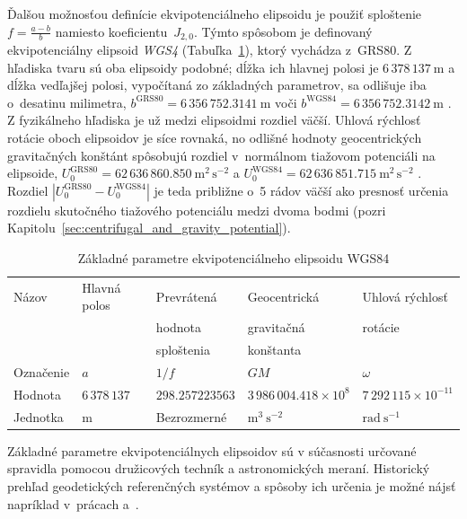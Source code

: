 \documentclass[a4paper,12pt]{book}
\begin{document}
Ďalšou možnosťou definície ekvipotenciálneho elipsoidu je použiť sploštenie~$f 
= \frac{a - b}{b}$ namiesto koeficientu~$J_{2,0}$.  Týmto spôsobom je 
definovaný ekvipotenciálny elipsoid \emph{WGS4} (Tabuľka~\ref{tab:2}), ktorý 
vychádza z~GRS80.  Z hľadiska tvaru sú oba elipsoidy podobné; dĺžka ich hlavnej 
polosi je $6\, 378\, 137\ \mathrm{m}$ a dĺžka vedľajšej polosi, vypočítaná zo 
základných parametrov, sa odlišuje iba o~desatinu milimetra, 
$b^{\mathrm{GRS80}} = 6\, 356\, 752.3141\ \mathrm{m}$ voči $b^{\mathrm{WGS84}} 
= 6\, 356\, 752.3142\ \mathrm{m}$ \parencite{MoritzPhysicalGeodesy}.  
Z fyzikálneho hľadiska je už medzi elipsoidmi rozdiel väčší.  Uhlová rýchlosť 
rotácie oboch elipsoidov je síce rovnaká, no odlišné hodnoty geocentrických 
gravitačných konštánt spôsobujú rozdiel v~normálnom tiažovom potenciáli na 
elipsoide, $U_{0}^{\mathrm{GRS80}} = 62\, 636\, 860.850\ \mathrm{m}^2 \, 
\mathrm{s}^{-2}$ a $U_{0}^{\mathrm{WGS84}} = 62\, 636\, 851.715\ \mathrm{m}^2 
\, \mathrm{s}^{-2}$ \parencite{MoritzPhysicalGeodesy}.  Rozdiel 
$|U_0^{\mathrm{GRS80}} - U_0^{\mathrm{WGS84}}|$ je teda približne o~5 rádov 
väčší ako presnosť určenia rozdielu skutočného tiažového potenciálu medzi dvoma 
bodmi (pozri Kapitolu~\ref{sec:centrifugal_and_gravity_potential}).

\begin{table}
\begin{center}
\caption{Základné parametre ekvipotenciálneho elipsoidu WGS84 
\parencite{WGS84}}
\label{tab:2}
\begin{tabular}{l l l l l}
\hline
Názov     & Hlavná polos & Prevrátená & Geocentrická & Uhlová rýchlosť \\
          &              & hodnota    & gravitačná  &  rotácie\\
          &              & sploštenia & konštanta               & \\
\hline
Označenie & $a$ & $1 \slash f$ & $GM$ & $\omega$\\
Hodnota   & $6\,378\,137$ & $298.257223563$ & $3\,986\,004.418 \times 10^8$ 
& $7\,292\,115 \times 10^{-11}$\\
Jednotka  & $\mathrm{m}$ & Bezrozmerné & $\mathrm{m}^3 \ \mathrm{s}^{-2}$ 
& $\mathrm{rad} \ \mathrm{s}^{-1}$\\
\hline
\end{tabular}
\end{center}
\end{table}

Základné parametre ekvipotenciálnych elipsoidov sú v súčasnosti určované 
spravidla pomocou družicových techník a astronomických meraní.  Historický 
prehľad geodetických referenčných systémov a spôsoby ich určenia je možné nájsť 
napríklad v~prácach \textcite{TorgeGeodesy} a~\textcite{MoritzPhysicalGeodesy}.
\end{document}
